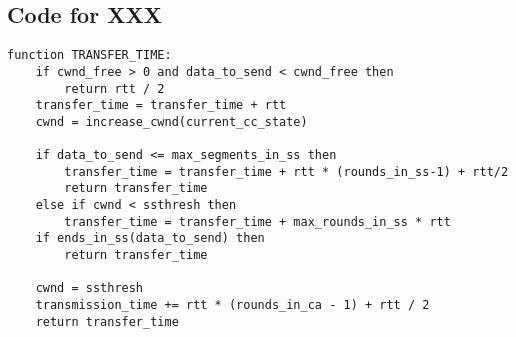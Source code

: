 \subsection{Code for XXX}
\begin{lstlisting}[frame=single, caption={XXX pseudo code, source: \cite{azuredevops}},label=code::XXX]
function TRANSFER_TIME:
    if cwnd_free > 0 and data_to_send < cwnd_free then
        return rtt / 2
    transfer_time = transfer_time + rtt
    cwnd = increase_cwnd(current_cc_state)

    if data_to_send <= max_segments_in_ss then
        transfer_time = transfer_time + rtt * (rounds_in_ss-1) + rtt/2
        return transfer_time
    else if cwnd < ssthresh then
        transfer_time = transfer_time + max_rounds_in_ss * rtt
    if ends_in_ss(data_to_send) then
        return transfer_time

    cwnd = ssthresh
    transmission_time += rtt * (rounds_in_ca - 1) + rtt / 2
    return transfer_time
\end{lstlisting}